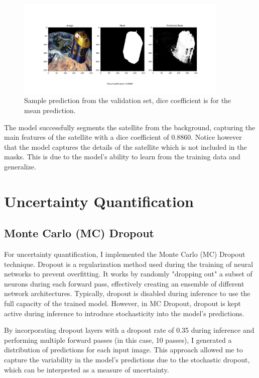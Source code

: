 \documentclass{article}
\begin{document}
\begin{figure}[h]
    \centering
    \includegraphics[width=0.9\textwidth]{../images/output_sample.png}
    \caption{Sample prediction from the validation set, dice coefficient is for the mean prediction.}
    \label{fig:sample_predictions}
\end{figure}

The model successfully segments the satellite from the background, capturing the main features of the satellite
with a dice coefficient of 0.8860. Notice however that the model captures the details of the satellite which is  
not included in the masks. This is due to the model's ability to learn from the training data and generalize.

\section{Uncertainty Quantification}
\subsection{Monte Carlo (MC) Dropout}

For uncertainty quantification, I implemented the Monte Carlo (MC) Dropout technique. Dropout is a regularization method 
used during the training of neural networks to prevent overfitting. It works by randomly "dropping out" a subset of neurons 
during each forward pass, effectively creating an ensemble of different network architectures. Typically, dropout is 
disabled during inference to use the full capacity of the trained model. However, in MC Dropout, dropout is kept active 
during inference to introduce stochasticity into the model's predictions.

By incorporating dropout layers with a dropout rate of 0.35 during inference and performing multiple forward passes 
(in this case, 10 passes), I generated a distribution of predictions for each input image. This approach allowed me to 
capture the variability in the model's predictions due to the stochastic dropout, which can be interpreted as a measure of 
uncertainty.
\end{document}
